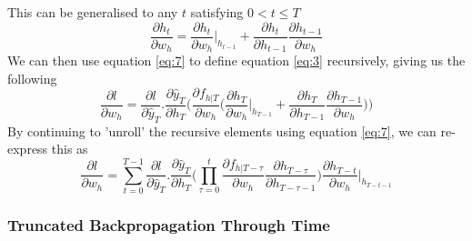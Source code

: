 \documentclass[]{article}
\begin{document}
This can be generalised to any $t$ satisfying $0 < t \leq T$
\begin{equation}
\frac{\partial h_{t}}{\partial w_{h}} = \frac{\partial h_{t}}{\partial w_{h}} \bigg|_{h_{t-1}} + \frac{\partial h_{t}}{\partial h_{t-1}} \frac{\partial h_{t-1}}{\partial w_{h}}\label{eq:7}
\end{equation}
We can then use equation \ref{eq:7} to define equation \ref{eq:3} recursively, giving us the following
\begin{equation}
\frac{\partial l}{\partial w_{h}} = \frac{\partial l}{\partial \hat{y}_{T}} . \frac{\partial \hat{y}_{T}}{\partial h_{T}} \bigg( \frac{\partial f_{h|T}}{\partial w_{h}} \bigg( \frac{\partial h_{T}}{\partial w_{h}} \bigg|_{h_{T-1}} + \frac{\partial h_{T}}{\partial h_{T-1}} \frac{\partial h_{T-1}}{\partial w_{h}} \bigg) \bigg )\label{eq:8}
\end{equation}
By continuing to 'unroll' the recursive elements using equation \ref{eq:7}, we can re-express this as
\begin{equation}
\frac{\partial l}{\partial w_{h}} = \sum_{t=0}^{T-1}  \frac{\partial l}{\partial \hat{y}_{T}} . \frac{\partial \hat{y}_{T}}{\partial h_{T}}  \bigg( \prod_{\tau=0}^{t} \frac{\partial f_{h|T - \tau}}{\partial w_{h}} \frac{\partial h_{T - \tau}}{\partial h_{T - \tau-1}} \bigg ) \frac{\partial h_{T-t}}{\partial w_{h}} \bigg|_{h_{T-t-1}} \label{eq:9}
\end{equation}
\subsubsection{Truncated Backpropagation Through Time}
\end{document}
